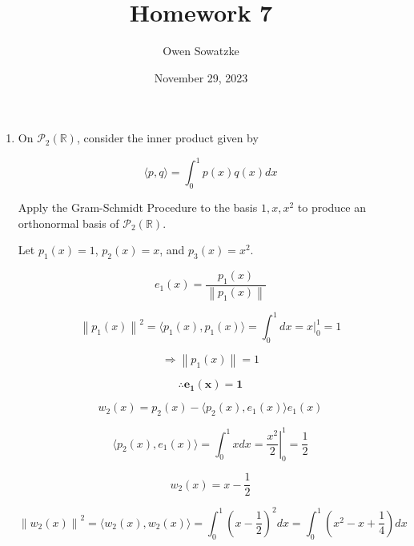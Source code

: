 \documentclass[fleqn]{article}
\title{Homework 7}
\author{Owen Sowatzke}
\date{November 29, 2023}
\newcommand{\zerodisplayskip}{
	\setlength{\abovedisplayskip}{0pt}%
	\setlength{\belowdisplayskip}{0pt}%
	\setlength{\abovedisplayshortskip}{0pt}%
	\setlength{\belowdisplayshortskip}{0pt}%
	\setlength{\mathindent}{0pt}}
\newcommand{\norm}[1]{\left \lVert #1 \right \rVert}
\begin{document}
	\offinterlineskip
	\setlength{\lineskip}{12pt}
	\zerodisplayskip
	\maketitle
	
	\begin{enumerate}[nolistsep]
		\item On $\mathcal{P}_2(\mathbb{R})$, consider the inner product given by
		
		\begin{equation*}
			\langle p, q \rangle = \int_{0}^{1}{p(x)q(x)dx}
		\end{equation*}
		
		Apply the Gram-Schmidt Procedure to the basis $1, x, x^2$ to produce an orthonormal basis of $\mathcal{P}_2(\mathbb{R})$.
		
		Let $p_1(x) = 1$, $p_2(x) = x$, and $p_3(x) = x^2$.
		
		\begin{equation*}
			e_1(x) = \frac{p_1(x)}{\norm{p_1(x)}}
		\end{equation*}  
		
		\begin{equation*}
			\norm{p_1(x)}^2 = \langle p_1(x), p_1(x) \rangle = \int_{0}^{1}{dx} = \left.x\right\vert_{0}^{1} = 1
		\end{equation*}
		
		\begin{equation*}
			\Rightarrow \norm{p_1(x)} = 1			
		\end{equation*}
		
		\begin{equation*}
			\mathbf{\therefore e_1(x) = 1}
		\end{equation*}
		
		\begin{equation*}
			w_2(x) = p_2(x) - \langle p_2(x), e_1(x) \rangle e_1(x)
		\end{equation*}
		
		\begin{equation*}
			\langle p_2(x), e_1(x) \rangle = \int_{0}^{1}{x dx} = \left.\frac{x^2}{2}\right\vert_{0}^{1} = \frac{1}{2}
		\end{equation*}
		
		\begin{equation*}
			w_2(x) = x - \frac{1}{2}
		\end{equation*}
		
		\begin{equation*}
			\norm{w_2(x)}^2 = \langle w_2(x), w_2(x) \rangle = \int_{0}^{1}{\left(x - \frac{1}{2}\right)^{2}dx} = \int_{0}^{1}{\left(x^{2} - x + \frac{1}{4}\right)dx}
		\end{equation*}
		

\end{enumerate}
\end{document}
